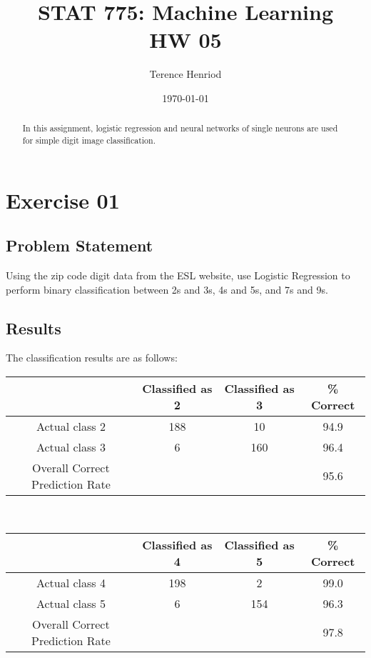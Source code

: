 \documentclass{article}
\title{STAT 775: Machine Learning \\ HW 05}
\author{Terence Henriod}
\date{\today}
\begin{document}
\clearpage            %
\maketitle            %
\thispagestyle{empty} %

\begin{abstract}
In this assignment, logistic regression and neural networks of single neurons are used for simple digit image classification.
\end{abstract}

\newpage
\section{Exercise 01}
\subsection{Problem Statement}
Using the zip code digit data from the ESL website, use Logistic Regression to perform binary classification between 2s and 3s, 4s and 5s, and 7s and 9s.

\subsection{Results}
The classification results are as follows:\\
%
\newline
\begin{tabular}{| c || c | c | c |}
  \hline
                                  & Classified as 2 & Classified as 3 & \% Correct \\
  \hline
  Actual class 2                  & 188             & 10              & 94.9 \\
  \hline
  Actual class 3                  & 6               & 160             & 96.4 \\
  \hline
  \hline
  Overall Correct Prediction Rate &                 &                 & 95.6 \\
  \hline
\end{tabular}

\hfill\\%
\newline
\begin{tabular}{| c || c | c | c |}
  \hline
                                  & Classified as 4 & Classified as 5 & \% Correct \\
  \hline
  Actual class 4                  & 198             & 2               & 99.0 \\
  \hline
  Actual class 5                  & 6               & 154             & 96.3 \\
  \hline
  \hline
  Overall Correct Prediction Rate &                 &                 & 97.8 \\
  \hline
\end{tabular}
\end{document}
